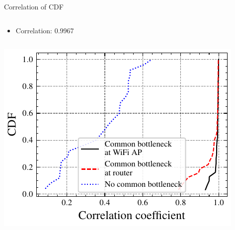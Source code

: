 \documentclass[presentation]{beamer}
\begin{document}
\begin{frame}[allowframebreaks,label=]{Correlation of CDF}
\begin{columns}
\begin{column}{.56\columnwidth}
\begin{itemize}
\item Correlation: 0.9967
\end{itemize}
\end{column}
\end{columns}
\begin{center}
\includegraphics[width=.9\linewidth]{figures/double-cdf/double-cdf-all-over2-no-video.pdf}
\end{center}
\end{frame}
\end{document}
